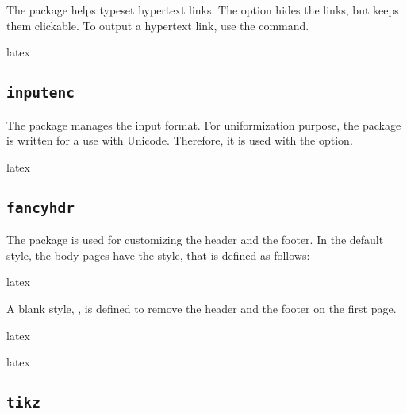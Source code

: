 \documentclass{report}
\begin{document}
The  package helps typeset hypertext links.
The  option hides the links, but keeps them clickable.
To output a hypertext link, use the  command.

\begin{imtaCode}{latex}
\RequirePackage[hidelinks]{hyperref}
\end{imtaCode}


\subsection{\texttt{inputenc}}

The  package manages the input format.
For uniformization purpose, the  package is written for a use with Unicode.
Therefore, it is used with the  option.

\begin{imtaCode}{latex}
\RequirePackage[utf8]{inputenc}
\end{imtaCode}


\subsection{\texttt{fancyhdr}}

The  package is used for customizing the header and the footer.
In the default style, the body pages have the  style, that is defined as follows:

\begin{imtaCode}{latex}
\pagestyle{fancy}
\fancyhead{}
\fancyfoot{}
\fancyhead[L]{\thetitle}
\fancyhead[R]{\imtaTheAuthorShort}
\fancyfoot[C]{\thepage}
\end{imtaCode}

A blank style, , is defined to remove the header and the footer on the first page.

\begin{imtaCode}{latex}
\end{imtaCode}


\begin{imtaCode}{latex}
\RequirePackage{fancyhdr}
\end{imtaCode}

\subsection{\texttt{tikz}}
\end{document}
